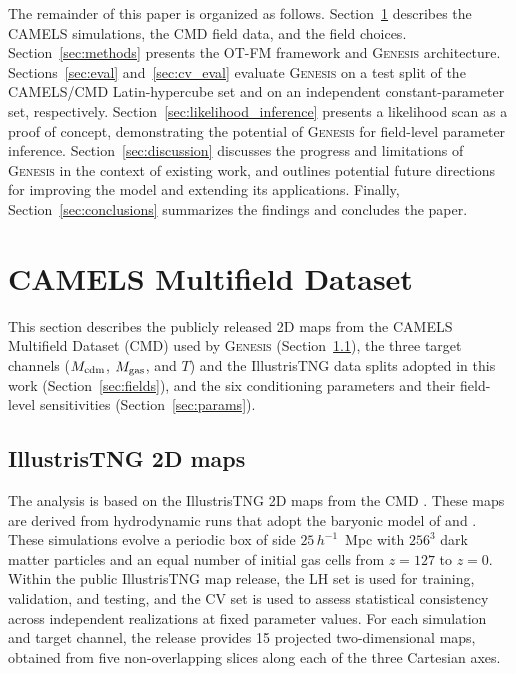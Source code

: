 \documentclass[usenatbib]{mnras}
\newcommand{\Mcdm}{M_{\rm cdm}}
\newcommand{\Mgas}{M_{\rm gas}}
\newcommand{\Tgas}{T}
\begin{document}
The remainder of this paper is organized as follows.
Section~\ref{sec:data} describes the CAMELS simulations, the CMD
field data, and the field choices.
Section~\ref{sec:methods} presents the OT-FM framework and \textsc{Genesis}
architecture.
Sections~\ref{sec:eval} and~\ref{sec:cv_eval} evaluate \textsc{Genesis}
on a test split of the CAMELS/CMD Latin-hypercube set and on an
independent constant-parameter set, respectively.
Section~\ref{sec:likelihood_inference} presents a likelihood scan as a proof of
concept, demonstrating the potential of \textsc{Genesis} for field-level
parameter inference.
Section~\ref{sec:discussion} discusses the progress and limitations of \textsc{Genesis} 
in the context of existing work, and outlines potential future directions for improving the model and extending its applications. 
Finally, Section~\ref{sec:conclusions} summarizes the findings and concludes the paper.

\section{CAMELS Multifield Dataset}
\label{sec:data}
This section describes the publicly released 2D maps from the CAMELS
Multifield Dataset (CMD) used by \textsc{Genesis}
(Section~\ref{sec:camels}), the three target channels
($\Mcdm$, $\Mgas$, and $\Tgas$) and the IllustrisTNG data splits
adopted in this work (Section~\ref{sec:fields}), and the six
conditioning parameters and their field-level sensitivities
(Section~\ref{sec:params}).

\subsection{IllustrisTNG 2D maps}
\label{sec:camels}
The analysis is based on the IllustrisTNG 2D maps from the CMD
\citep{Villaescusa2022}. These maps are derived from hydrodynamic
runs that adopt the baryonic model of \citet{Weinberger2017} and
\citet{Pillepich2018IllustrisTNG}.
These simulations evolve a periodic box of side
$25\,h^{-1}$~Mpc with $256^3$ dark matter particles and an equal
number of initial gas cells from $z=127$ to $z=0$.
Within the public IllustrisTNG map release, the LH set is used for
training, validation, and testing, and the CV set is used to assess
statistical consistency across independent realizations at fixed
parameter values. For each simulation and target channel, the release
provides 15 projected two-dimensional maps, obtained from five
non-overlapping slices along each of the three Cartesian axes.
\end{document}
